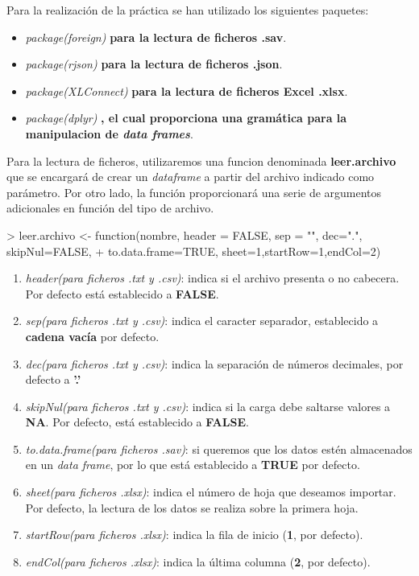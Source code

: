 \documentclass [a4paper] {article}
\begin{document}
Para la realización de la práctica se han utilizado los siguientes paquetes:
\begin{itemize}
	\item \textit{package(foreign)} \textbf{para la lectura de ficheros .sav}.
	\item \textit{package(rjson)} \textbf{para la lectura de ficheros .json}.
	\item \textit{package(XLConnect)} \textbf{para la lectura de ficheros Excel .xlsx}.
	\item \textit{package(dplyr)} \textbf{, el cual proporciona una gramática para la manipulacion de \textit{data frames}}.
\end{itemize}

Para la lectura de ficheros, utilizaremos una funcion denominada \textbf{leer.archivo} que se encargará de crear un \textit{dataframe} a partir del archivo indicado como parámetro. Por otro lado, la función proporcionará una
serie de argumentos adicionales en función del tipo de archivo.
\newpage
\begin{Schunk}
\begin{Sinput}
> leer.archivo <- function(nombre, header = FALSE, sep = "", dec=".", skipNul=FALSE, 
+ to.data.frame=TRUE, sheet=1,startRow=1,endCol=2){}
\end{Sinput}
\end{Schunk}
\begin{enumerate}
	\item \textit{header(para ficheros .txt y .csv)}: indica si el archivo presenta o no cabecera. Por defecto está establecido a \textbf{FALSE}.
	\item \textit{sep(para ficheros .txt y .csv)}: indica el caracter separador, establecido a \textbf{cadena vacía} por defecto.
	\item \textit{dec(para ficheros .txt y .csv)}: indica la separación de números decimales, por defecto a \textbf{'.'}
	\item \textit{skipNul(para ficheros .txt y .csv)}: indica si la carga debe saltarse valores a \textbf{NA}. Por defecto, está establecido a \textbf{FALSE}.
	\item \textit{to.data.frame(para ficheros .sav)}: si queremos que los datos estén almacenados en un \textit{data frame}, por lo que está establecido a \textbf{TRUE} por defecto.
	\item \textit{sheet(para ficheros .xlsx)}: indica el número de hoja que deseamos importar. Por defecto, la lectura de los datos se realiza sobre la primera hoja.
	\item \textit{startRow(para ficheros .xlsx)}: indica la fila de inicio (\textbf{1}, por defecto).
	\item \textit{endCol(para ficheros .xlsx)}: indica la última columna (\textbf{2}, por defecto).
\end{enumerate}
\end{document}
